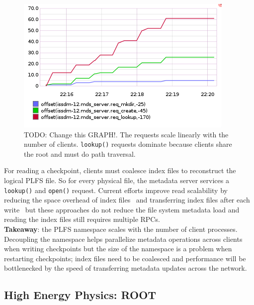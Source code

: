 \begin{figure}[tb]
\centering
  \includegraphics[width=1\linewidth]{figures/prob_reqs.png} 
  \caption{TODO: Change this GRAPH!. The requests scale linearly with the
number of clients.  \texttt{lookup()} requests dominate because clients share
the root and must do path traversal.  }\label{fig:prob_reqs}
\end{figure}

For reading a checkpoint, clients must coalesce index files to reconstruct the
logical PLFS file. So for every physical file, the metadata server services a
\texttt{lookup()} and \texttt{open()} request. Current efforts improve read
scalability by reducing the space overhead of index
files~\cite{he:hpdc13-plfs-patterns} and transferring index files after each
write~\cite{grider:pc17-diddlings} but these approaches do not reduce the file
system metadata load and reading the index files still requires multiple RPCs.\\

\textbf{Takeaway}: the PLFS namespace scales with the number of client
processes. Decoupling the namespace helps parallelize metadata operations
across clients when writing checkpoints but the size of the namespace is a
problem when restarting checkpoints; index files need to be coalesced and
performance will be bottlenecked by the speed of transferring metadata updates
across the network.

\subsection{High Energy Physics: ROOT}

